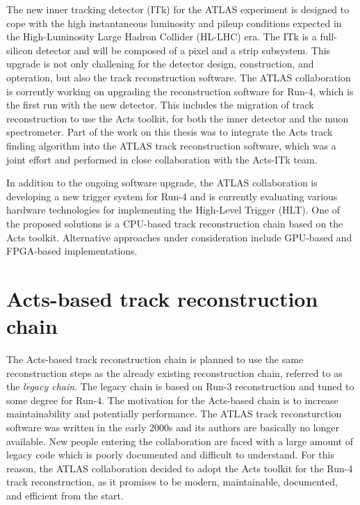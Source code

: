 
The new inner tracking detector (ITk) for the ATLAS experiment is designed to cope with the high instantaneous luminosity and pileup conditions expected in the High-Luminosity Large Hadron Collider (HL-LHC) era. The ITk is a full-silicon detector and will be composed of a pixel \cite{itk-pixel-tdr} and a strip \cite{itk-strip-tdr} subsystem. This upgrade is not only challening for the detector design, construction, and opteration, but also the track reconstruction software. The ATLAS collaboration is corrently working on upgrading the reconstruction software for Run-4, which is the first run with the new detector. This includes the migration of track reconstruction to use the Acts toolkit, for both the inner detector and the muon spectrometer. Part of the work on this thesis was to integrate the Acts track finding algorithm into the ATLAS track reconstruction software, which was a joint effort and performed in close collaboration with the Acts-ITk team.

In addition to the ongoing software upgrade, the ATLAS collaboration is developing a new trigger system for Run-4 and is currently evaluating various hardware technologies for implementing the High-Level Trigger (HLT). One of the proposed solutions is a CPU-based track reconstruction chain based on the Acts toolkit. Alternative approaches under consideration include GPU-based and FPGA-based implementations.

\section{Acts-based track reconstruction chain}

The Acts-based track reconstruction chain is planned to use the same reconstruction steps as the already existing reconstruction chain, referred to as the \textit{legacy chain}. The legacy chain is based on Run-3 reconstruction \cite{atlas-sac-run3} and tuned to some degree for Run-4. The motivation for the Acts-based chain is to increase maintainability and potentially performance. The ATLAS track reconsturction software was written in the early 2000s and its authors are basically no longer available. New people entering the collaboration are faced with a large amount of legacy code which is poorly documented and difficult to understand. For this reason, the ATLAS collaboration decided to adopt the Acts toolkit for the Run-4 track reconstruction, as it promises to be modern, maintainable, documented, and efficient from the start.


